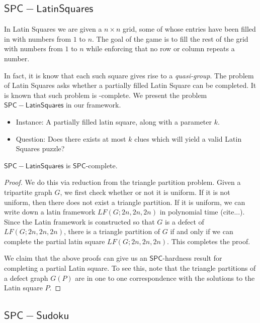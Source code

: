 \documentclass[runningheads,a4paper]{llncs}
\begin{document}
\subsection{$\mathsf{SPC-LatinSquares}$}

In Latin Squares we are given a $n \times n$ grid, some of whose entries have been filled in with numbers from $1$ to $n$. The goal of the game is to fill the rest of the grid with numbers from $1$ to $n$ while enforcing that no row or column repeats a number. 

In fact, it is know that each such square gives rise to a \emph{quasi-group}. The problem of Latin Squares asks whether a partially filled Latin Square can be completed. It is known that such problem is \NP-complete. We present the problem $\mathsf{SPC-Latin Squares}$ in our framework.

\begin{itemize}
\item Instance: A partially filled latin square, along with a parameter $k$. 
\item Question: Does there exists at most $k$ clues which will yield a valid Latin Squares puzzle?
\end{itemize}


\begin{theorem}
$\mathsf{SPC-Latin Squares}$ is $\mathsf{SPC}$-complete.
\end{theorem}

\begin{proof}
We do this via reduction from the triangle partition problem. Given a tripartite graph $G$, we first check whether or not it is uniform. If it is not uniform, then there does not exist a triangle partition. If it is uniform, we can write down a latin framework $LF(G;2n,2n,2n)$ in polynomial time (cite...). Since the Latin framework is constructed so that $G$ is a defect of $LF(G;2n,2n,2n)$, there is a triangle partition of $G$ if and only if we can complete the partial latin square $LF(G;2n,2n,2n)$. This completes the proof.

We claim that the above proofs can give us an $\mathsf{SPC}$-hardness result for completing a partial Latin square. To see this, note that the triangle partitions of a defect graph $G(P)$ are in one to one correspondence with the solutions to the Latin square $P$.
\end{proof}

\subsection{$\mathsf{SPC-Sudoku}$}
\end{document}
